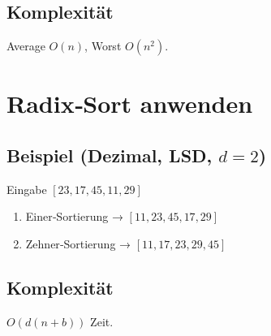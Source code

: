 \subsection*{Komplexität}
Average $O(n)$, Worst $O(n^{2})$.

\section{Radix‑Sort anwenden}
\subsection*{Beispiel (Dezimal, LSD, $d=2$)}
Eingabe \([23,17,45,11,29]\)
\begin{enumerate}[label=Stelle~\arabic*]
  \item Einer‑Sortierung → \([11,23,45,17,29]\)
  \item Zehner‑Sortierung → \([11,17,23,29,45]\)
\end{enumerate}

\subsection*{Komplexität}
$O(d(n+b))$ Zeit.

